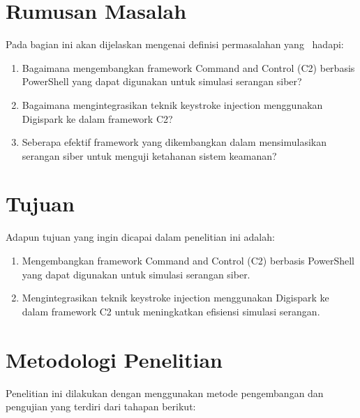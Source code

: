 \section{Rumusan Masalah}
Pada bagian ini akan dijelaskan mengenai definisi permasalahan 
yang \saya~hadapi:
\begin{enumerate}
    \item Bagaimana mengembangkan framework Command and Control (C2) berbasis PowerShell yang dapat digunakan untuk simulasi serangan siber?
    \item Bagaimana mengintegrasikan teknik keystroke injection menggunakan Digispark ke dalam framework C2?
    \item Seberapa efektif framework yang dikembangkan dalam mensimulasikan serangan siber untuk menguji ketahanan sistem keamanan?
\end{enumerate}


\section{Tujuan}
Adapun tujuan yang ingin dicapai dalam penelitian ini adalah:

\begin{enumerate}
    \item Mengembangkan framework Command and Control (C2) berbasis PowerShell yang dapat digunakan untuk simulasi serangan siber.
    \item Mengintegrasikan teknik keystroke injection menggunakan Digispark ke dalam framework C2 untuk meningkatkan efisiensi simulasi serangan.
\end{enumerate}

\section{Metodologi Penelitian}
Penelitian ini dilakukan dengan menggunakan metode pengembangan dan pengujian yang terdiri dari tahapan berikut:

